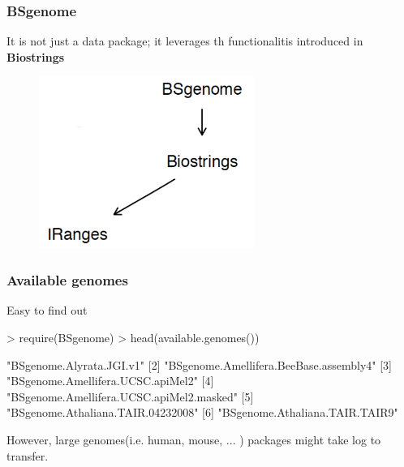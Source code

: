 \documentclass{beamer}
\begin{document}

\begin{frame}
\frametitle{BSgenome}
  \bit
      \item It is not just a data package; it leverages th functionalitis introduced in \textbf{Biostrings}
            \begin{figure}[ht]
              \centering
              \includegraphics[width=70mm]{diagramas/Seleccio_005.png}
            \end{figure}
  \eit
\end{frame}


\begin{frame}[fragile]
\frametitle{Available genomes}
  \bit
      \item Easy to find out
          \begin{uncoverenv}
\begin{Schunk}
\begin{Sinput}
> require(BSgenome)
> head(available.genomes())
\end{Sinput}
\begin{Soutput}
[1] "BSgenome.Alyrata.JGI.v1"                
[2] "BSgenome.Amellifera.BeeBase.assembly4"  
[3] "BSgenome.Amellifera.UCSC.apiMel2"       
[4] "BSgenome.Amellifera.UCSC.apiMel2.masked"
[5] "BSgenome.Athaliana.TAIR.04232008"       
[6] "BSgenome.Athaliana.TAIR.TAIR9"          
\end{Soutput}
\end{Schunk}
          \end{uncoverenv}
      \item However, large genomes(i.e. human, mouse, ... ) packages might take log to transfer.
  \eit
\end{frame}
\end{document}
